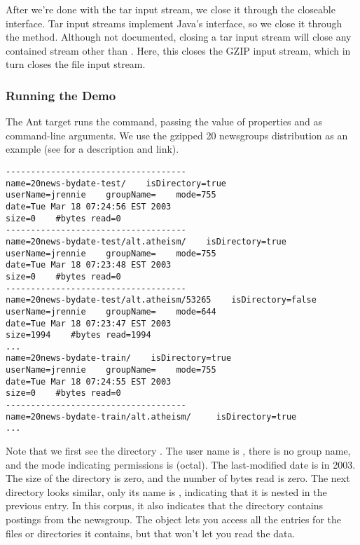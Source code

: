 After we're done with the tar input stream, we close it through the
closeable interface.
%
%
Tar input streams implement Java's  interface, so we
close it through the  method.  Although not documented,
closing a tar input stream will close any contained stream other than
.  Here, this closes the GZIP input stream, which in
turn closes the file input stream.

\subsubsection{Running the Demo}

The Ant target  runs the command, passing the
value of properties  and  as command-line
arguments.  We use the gzipped 20 newsgroups distribution as an
example (see  for a description and link).
%
\begin{verbatim}
------------------------------------
name=20news-bydate-test/    isDirectory=true
userName=jrennie    groupName=    mode=755
date=Tue Mar 18 07:24:56 EST 2003
size=0    #bytes read=0
------------------------------------
name=20news-bydate-test/alt.atheism/    isDirectory=true
userName=jrennie    groupName=    mode=755
date=Tue Mar 18 07:23:48 EST 2003
size=0    #bytes read=0
------------------------------------
name=20news-bydate-test/alt.atheism/53265    isDirectory=false
userName=jrennie    groupName=    mode=644
date=Tue Mar 18 07:23:47 EST 2003
size=1994    #bytes read=1994
...
name=20news-bydate-train/    isDirectory=true
userName=jrennie    groupName=    mode=755
date=Tue Mar 18 07:24:55 EST 2003
size=0    #bytes read=0
------------------------------------
name=20news-bydate-train/alt.atheism/     isDirectory=true
...
\end{verbatim}
%
Note that we first see the directory .  The
user name is , there is no group name, and the mode
indicating permissions is  (octal).  The last-modified date
is in 2003.  The size of the directory is zero, and the number of
bytes read is zero.  The next directory looks similar, only its name
is , indicating that it is nested in the
previous entry.  In this corpus, it also indicates that the directory
contains postings from the  newsgroup.  The
 object lets you access all the entries for the files
or directories it contains, but that won't let you read the data.


